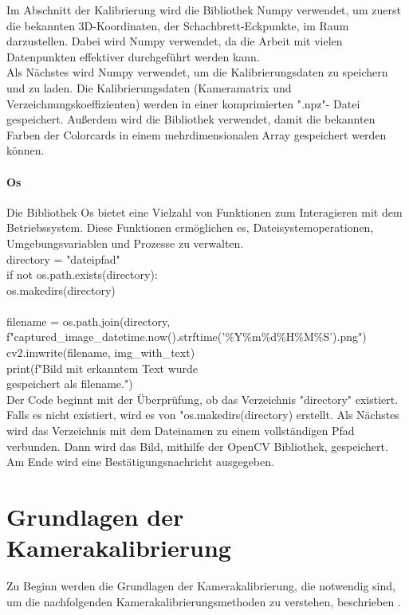 {Im Abschnitt der Kalibrierung wird die Bibliothek Numpy verwendet, um zuerst die bekannten 3D-Koordinaten, der Schachbrett-Eckpunkte, im Raum darzustellen. Dabei wird Numpy verwendet, da die Arbeit mit vielen Datenpunkten effektiver durchgeführt werden kann.\\ Als Nächstes wird Numpy verwendet, um die Kalibrierungsdaten zu speichern und zu laden. Die Kalibrierungsdaten (Kameramatrix und Verzeichnungskoeffizienten) werden in einer komprimierten ".npz"-   
Datei gespeichert. Außerdem wird die Bibliothek verwendet, damit die bekannten Farben der Colorcards in einem mehrdimensionalen Array gespeichert werden können.  

\newpage

\subsubsection{Os}
Die Bibliothek Os bietet eine Vielzahl von Funktionen zum Interagieren mit dem Betriebssystem. Diese Funktionen ermöglichen es, Dateisystemoperationen, Umgebungsvariablen und Prozesse zu verwalten.\\


directory = "dateipfad"\\
if not os.path.exists(directory):\\
os.makedirs(directory)\\
\\
filename = os.path.join(directory, \\
f"captured\_image\_{datetime.now().strftime('\%Y\%m\%d\%H\%M\%S')}.png")\\
cv2.imwrite(filename, img\_with\_text)\\
print(f"Bild mit erkanntem Text wurde\\ gespeichert als {filename}.")\\


Der Code beginnt mit der Überprüfung, ob das Verzeichnis "directory" existiert. Falls es nicht existiert, wird es von "os.makedirs(directory) erstellt. Als Nächstes wird das Verzeichnis mit dem Dateinamen zu einem vollständigen Pfad verbunden. Dann wird das Bild, mithilfe der OpenCV Bibliothek, gespeichert. Am Ende wird eine Bestätigungsnachricht ausgegeben.  

\chapter{Grundlagen der Kamerakalibrierung}

Zu Beginn werden die Grundlagen der Kamerakalibrierung, die notwendig 
sind, um die nachfolgenden Kamerakalibrierungsmethoden zu verstehen, beschrieben \cite{Gradias:2014}. 

}

